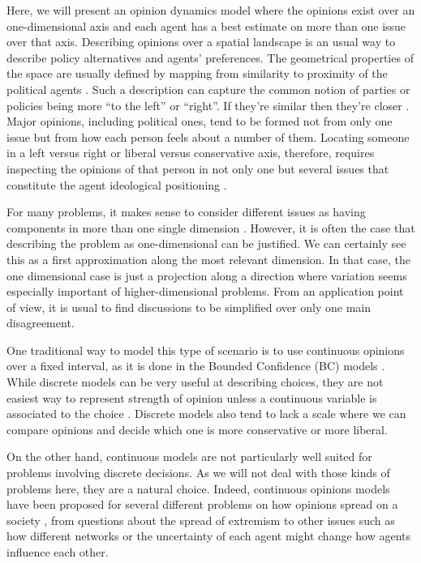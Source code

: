 \documentclass{article}
\begin{document}
Here, we will present an opinion dynamics model
\cite{castellanoetal07,galam12a,galametal82,galammoscovici91,sznajd00,deffuantetal00,martins08a}
where the opinions exist over an one-dimensional axis and each agent has a best
estimate on more than one issue over that axis. Describing opinions over a
spatial landscape is an usual way to describe policy alternatives and agents'
preferences. The geometrical properties of the space are usually defined by
mapping from similarity to proximity of the political agents
\cite{downs1957economic, laver2014measuring}. Such a description can capture the
common notion of parties or policies being more ``to the left'' or ``right''. If
they're similar then they're closer \cite{van2005political, miller2015spatial}.
Major opinions, including political ones, tend to be formed not from only one
issue but from how each person feels about a number of them. Locating someone in
a left versus right or liberal versus conservative axis, therefore, requires
inspecting the opinions of that person in not only one but several issues that constitute the agent ideological positioning \cite{benoit2006party}.

For many problems, it makes sense to consider different issues as having components in
more than one single dimension \cite{vicenteetal08b}. However, it is often the case that describing the problem as
one-dimensional can be justified. We can certainly see this as a
first approximation along the most relevant dimension. In that case, the one dimensional case is
just a projection along a direction where variation seems especially important of higher-dimensional problems. From an application point of view, it is usual to find discussions to be simplified over only one main disagreement.  

One traditional way to model this type of scenario is to use continuous opinions
over a fixed interval, as it is done in the Bounded Confidence (BC) models
\cite{deffuantetal00,hegselmannkrause02}. While discrete models
\cite{galametal82,galammoscovici91,sznajd00} can be very useful at describing
choices, they are not easiest way to represent strength of opinion unless a
continuous variable is associated to the choice \cite{martins08a}. Discrete
models also tend to lack a scale where we can compare opinions and decide which
one is more conservative or more liberal.

On the other hand, continuous models are not particularly well suited for
problems involving discrete decisions. As we will not deal with those kinds of
problems here, they are a natural choice. Indeed, continuous opinions models
have been proposed for several different problems on how opinions spread on a
society \cite{deffuantetal02a,weisbuchetal05}, from questions about the spread
of extremism
\cite{amblarddeffuant04,gargiulomazzoni08a,franksetal08a,alizadeh14a,Albi2016,Mai2017}
to other issues such as how different networks
\cite{Kurmyshev2011,Acemoglu2011,Das2014,Hu2017} or the uncertainty of each
agent \cite{deffuant06} might change how agents influence each other.
\end{document}
